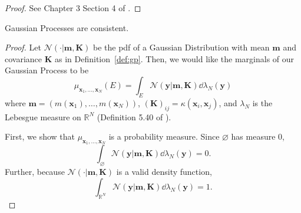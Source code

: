 \begin{proof}
    See Chapter 3 Section 4 of \cite{kolmogorov1933}.
\end{proof}

\begin{theorem}
    \label{thm:gp-const}
    Gaussian Processes are consistent.
\end{theorem}
\begin{proof}
    Let $\mathcal{N}( \cdot | \mathbf{m}, \mathbf{K})$
    be the pdf of a Gaussian Distribution with mean $\mathbf{m}$ and covariance $\mathbf{K}$ as in Definition~\ref{def:gp}.
    Then, we would like the marginals of our Gaussian Process to be
    \begin{equation*}
        \mu_{\mathbf{x}_1, \dots, \mathbf{x}_N}(E)
        = \int_{E} \mathcal{N}( \mathbf{y} | \mathbf{m}, \mathbf{K}) \dd \lambda_N(\mathbf{y})
    \end{equation*}
    where $\mathbf{m} = (m(\mathbf{x}_1), \dots, m(\mathbf{x}_N))$,
    $(\mathbf{K})_{ij} = \kappa(\mathbf{x}_i, \mathbf{x}_j)$, and
    $\lambda_N$ is the Lebesgue measure on $\mathbb{R}^{N}$ (Definition 5.40 of \cite{axler2020}).

    First, we show that $\mu_{\mathbf{x}_1, \dots, \mathbf{x}_N}$ is a probability measure.
    Since $\varnothing$ has measure 0,
    \begin{equation*}
        \int_{\varnothing} \mathcal{N}(\mathbf{y} | \mathbf{m}, \mathbf{K}) \dd \lambda_N(\mathbf{y}) = 0.
    \end{equation*}
    Further, because $\mathcal{N}( \cdot | \mathbf{m}, \mathbf{K})$ is a valid density function,
    \begin{equation*}
        \int_{\mathbb{R}^{N}} \mathcal{N}(\mathbf{y} | \mathbf{m}, \mathbf{K}) \dd \lambda_N(\mathbf{y}) = 1.
    \end{equation*}


\end{proof}
